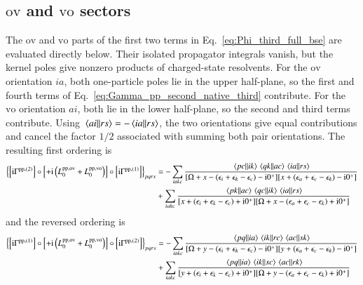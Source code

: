 \documentclass[aip,jcp,reprint,noshowkeys,superscriptaddress]{revtex4-1}
\newcommand{\eps}{\epsilon}
\newcommand{\ii}{\mathrm{i}}
\newcommand{\pp}{\text{pp}}
\begin{document}
\subsection{$\text{ov}$ and $\text{vo}$ sectors}

The $\text{ov}$ and $\text{vo}$ parts of the first two terms in
Eq.~\eqref{eq:Phi_third_full_bse} are evaluated directly below.
Their isolated propagator integrals vanish, but the kernel poles give
nonzero products of charged-state resolvents.
For the $\text{ov}$ orientation $ia$, both one-particle poles lie in the upper
half-plane, so the first and fourth terms of
Eq.~\eqref{eq:Gamma_pp_second_native_third} contribute.
For the $\text{vo}$ orientation $ai$, both lie in the lower half-plane, so the
second and third terms contribute.
Using $\mel{ai}{}{rs}=-\mel{ia}{}{rs}$, the two orientations give equal
contributions and cancel the factor $1/2$ associated with summing both pair orientations.
The resulting first ordering is
\begin{equation}
\begin{split}
\left\{
\left[\ii\Gamma^{\pp,(2)}\right]
\circ\left[+\ii\left(L_0^{\pp,\text{ov}}+L_0^{\pp,\text{vo}}\right)\right]
\circ\left[\ii\Gamma^{\pp,(1)}\right]
\right\}_{pqrs}
&=
-
\sum_{iakc}
\frac{
\mel{pc}{}{ik}\mel{qk}{}{ac}\mel{ia}{}{rs}
}
{[\Omega+x-(\eps_i+\eps_k-\eps_c)-\ii0^+]
 [x+(\eps_a+\eps_c-\eps_k)-\ii0^+]}
\\
&+
\sum_{iakc}
\frac{
\mel{pk}{}{ac}\mel{qc}{}{ik}\mel{ia}{}{rs}
}
{[x+(\eps_i+\eps_k-\eps_c)+\ii0^+]
 [\Omega+x-(\eps_a+\eps_c-\eps_k)+\ii0^+]}
\end{split}
\label{eq:Phi_pp_third_mixed_left}
\end{equation}
and the reversed ordering is
\begin{equation}
\begin{split}
\left\{
\left[\ii\Gamma^{\pp,(1)}\right]
\circ\left[+\ii\left(L_0^{\pp,\text{ov}}+L_0^{\pp,\text{vo}}\right)\right]
\circ\left[\ii\Gamma^{\pp,(2)}\right]
\right\}_{pqrs}
&=
-
\sum_{iakc}
\frac{
\mel{pq}{}{ia}\mel{ik}{}{rc}\mel{ac}{}{sk}
}
{[\Omega+y-(\eps_i+\eps_k-\eps_c)-\ii0^+]
 [y+(\eps_a+\eps_c-\eps_k)-\ii0^+]}
\\
&+
\sum_{iakc}
\frac{
\mel{pq}{}{ia}\mel{ik}{}{sc}\mel{ac}{}{rk}
}
{[y+(\eps_i+\eps_k-\eps_c)+\ii0^+]
 [\Omega+y-(\eps_a+\eps_c-\eps_k)+\ii0^+]}
\end{split}
\label{eq:Phi_pp_third_mixed_right}
\end{equation}
\end{document}
